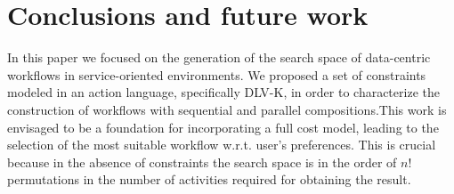 
\section{Conclusions and future work} \label{sec:conclusion}

In this paper we focused on the generation of the search space of data-centric workflows in service-oriented environments. We proposed a set of constraints modeled in an action language, specifically DLV-K, in order to characterize the construction of workflows with sequential and parallel compositions.This work is envisaged to be a foundation for incorporating a full cost model, leading to the selection of the most suitable workflow w.r.t. user's preferences. This is crucial because in the absence of constraints the search space is in the order of $n!$ permutations in the number of activities required for obtaining the result.
